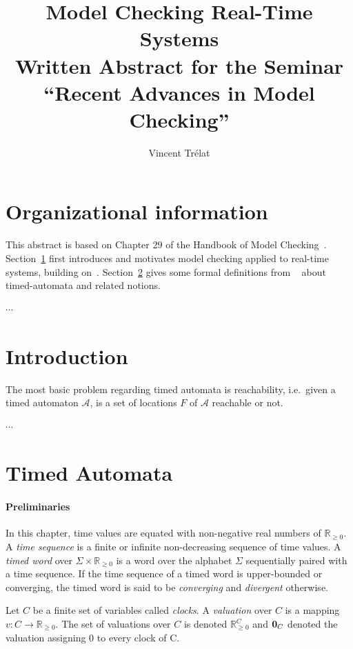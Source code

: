 \documentclass[11pt]{article}
\title{Model Checking Real-Time Systems\\\small Written Abstract for the Seminar ``Recent Advances in Model Checking''}
\author{Vincent Trélat}
\date{}
\theoremstyle{definition}
\theoremstyle{remark}
\begin{document}
\maketitle	

\section*{Organizational information}
This abstract is based on Chapter 29 of the Handbook of Model Checking~\cite{handbook}.
Section~\ref{sec:intro} first introduces and motivates model checking applied to real-time systems, building on~\cite[Chapters~29.1 and 29.2]{handbook}.
Section~\ref{sec:ta} gives some formal definitions from ~\cite[Chapter~29.2]{handbook} about timed-automata and related notions.

$\cdots$

\section{Introduction}\label{sec:intro}
The most basic problem regarding timed automata is reachability, i.e.\ given a timed automaton $\mathcal{A}$, is a set of locations $F$ of $\mathcal{A}$ reachable or not.

$\cdots$

\section{Timed Automata}\label{sec:ta}
\paragraph{Preliminaries}\label{par:prelims}
In this chapter, time values are equated with non-negative real numbers of $\mathbb{R}_{\geq 0}$. A \emph{time sequence} is a finite or infinite non-decreasing sequence of time values. A \emph{timed word} over $\Sigma \times \mathbb{R}_{\geq 0}$ is a word over the alphabet $\Sigma$ sequentially paired with a time sequence.
If the time sequence of a timed word is upper-bounded or converging, the timed word is said to be \emph{converging} and \emph{divergent} otherwise.

Let $C$ be a finite set of variables called \emph{clocks}. A \emph{valuation} over $C$ is a mapping $v \colon C \to \mathbb{R}_{\geq 0}$. The set of valuations over $C$ is denoted $\mathbb{R}_{\geq 0}^C$ and $\text{\bf 0}_C$ denoted the valuation assigning 0 to every clock of C.
\end{document}
